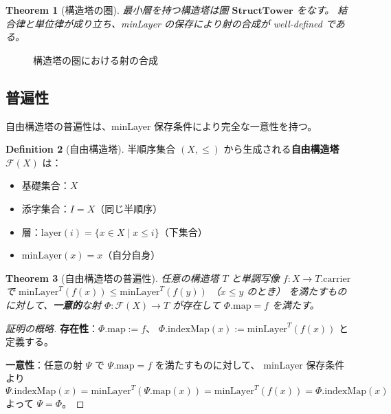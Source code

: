\documentclass[11pt,a4paper]{article}
\theoremstyle{plain}
\newtheorem{theorem}{Theorem}[section]
\theoremstyle{definition}
\newtheorem{definition}[theorem]{Definition}
\newcommand{\StructTower}{\mathbf{StructTower}}
\newcommand{\minLayer}{\mathrm{minLayer}}
\newcommand{\layer}{\mathrm{layer}}
\begin{document}
\begin{theorem}[構造塔の圏]
\label{thm:tower-category}
最小層を持つ構造塔は圏 $\StructTower$ をなす。
結合律と単位律が成り立ち、minLayer の保存により射の合成が well-defined である。
\end{theorem}

\begin{figure}[htbp]
\centering
{}
\caption{構造塔の圏における射の合成}
\label{fig:category-composition}
\end{figure}

\subsection{普遍性}

自由構造塔の普遍性は、minLayer 保存条件により完全な一意性を持つ。

\begin{definition}[自由構造塔]
\label{def:free-tower}
半順序集合 $(X, \leq)$ から生成される\textbf{自由構造塔} $\mathcal{F}(X)$ は：
\begin{itemize}
  \item 基礎集合：$X$
  \item 添字集合：$I = X$（同じ半順序）
  \item 層：$\layer(i) = \{x \in X \mid x \leq i\}$（下集合）
  \item $\minLayer(x) = x$（自分自身）
\end{itemize}
\end{definition}

\begin{theorem}[自由構造塔の普遍性]
\label{thm:free-tower-universal}
任意の構造塔 $T$ と単調写像 $f : X \to T.\mathrm{carrier}$ で
$\minLayer^T(f(x)) \leq \minLayer^T(f(y))$ （$x \leq y$ のとき）
を満たすものに対して、\textbf{一意的}な射 
$\Phi : \mathcal{F}(X) \to T$ が存在して $\Phi.\mathrm{map} = f$ を満たす。
\end{theorem}

\begin{proof}[証明の概略]
\textbf{存在性}：$\Phi.\mathrm{map} := f$、
$\Phi.\mathrm{indexMap}(x) := \minLayer^T(f(x))$ と定義する。

\textbf{一意性}：任意の射 $\Psi$ で $\Psi.\mathrm{map} = f$ を満たすものに対して、
minLayer 保存条件より
\[
  \Psi.\mathrm{indexMap}(x) = \minLayer^T(\Psi.\mathrm{map}(x)) 
  = \minLayer^T(f(x)) = \Phi.\mathrm{indexMap}(x)
\]
よって $\Psi = \Phi$。
\end{proof}
\end{document}
